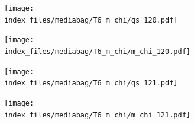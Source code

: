 \documentclass[
  11pt,
  letterpaper,
]{scrreprt}
\begin{document}
\begin{figure}

\begin{minipage}{0.50\linewidth}

\begin{figure}[H]

{\centering \texttt{[image: index\_files/mediabag/T6\_m\_chi/qs\_120.pdf]}

}


\end{figure}%

\end{minipage}%
%
\begin{minipage}{0.50\linewidth}

\begin{figure}[H]

{\centering \texttt{[image: index\_files/mediabag/T6\_m\_chi/m\_chi\_120.pdf]}

}


\end{figure}%

\end{minipage}%

\end{figure}%

\begin{figure}

\begin{minipage}{0.50\linewidth}

\begin{figure}[H]

{\centering \texttt{[image: index\_files/mediabag/T6\_m\_chi/qs\_121.pdf]}

}


\end{figure}%

\end{minipage}%
%
\begin{minipage}{0.50\linewidth}

\begin{figure}[H]

{\centering \texttt{[image: index\_files/mediabag/T6\_m\_chi/m\_chi\_121.pdf]}

}


\end{figure}%

\end{minipage}%

\end{figure}%
\end{document}
